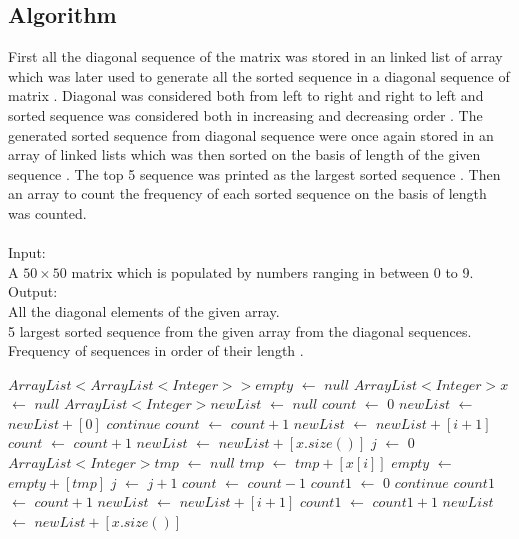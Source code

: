 \documentclass[twocolumn]{article}      %
\begin{document}
\subsection{Algorithm}
First all the diagonal sequence of the matrix was stored in an linked list of array which was later used to generate all the sorted sequence in a diagonal sequence of matrix . Diagonal was considered both from left to right and right to left and sorted sequence was considered both in increasing and decreasing order . The generated sorted sequence from diagonal sequence were once again stored in an array of linked lists which was then sorted on the basis of length of the given sequence . The top 5 sequence was printed as the largest sorted sequence . Then an array to count the frequency of each sorted sequence on the basis of length was counted.\\\\
Input:\\
A $50\times50$ matrix which is populated by numbers ranging in between 0 to 9.
Output:\\
All the diagonal elements of the given array.\\
5 largest sorted sequence from the given array from the diagonal sequences.\\
Frequency of sequences in order of their length .
\begin{algorithm}
\begin{algorithmic}[1]
\State $ArrayList<ArrayList<Integer>>empty$ $\gets$ $null$
\State $ArrayList<Integer>x$ $\gets$ $null$
\State $ArrayList<Integer>newList$ $\gets$ $null$
\State $count$ $\gets$ $0$
\State $newList$ $\gets$ $newList+[0]$ 
\State $continue$
\EndIf
{}
\State $count$ $\gets$ $count+1$
\State $newList$ $\gets$ $newList + [i+1]$
\EndIf
\EndFor
\State $count$ $\gets$ $count+1$
\State $newList$ $\gets$ $newList+[x.size()]$
\State $j$ $\gets$ $0$
\State $ArrayList<Integer>tmp$ $\gets$ $null$
\State $tmp$ $\gets$ $tmp+[x[i]] $
\EndFor
\State $empty$ $\gets$ $empty+[tmp]$
\State $j$ $\gets$ $j+1$
\State $count$ $\gets$ $count-1$
\EndWhile
\State $count1$ $\gets$ $0$
\State $continue$
\EndIf
{}
\State $count1$ $\gets$ $count+1$
\State $newList$ $\gets$ $newList + [i+1]$
\EndIf
\EndFor
\State $count1$ $\gets$ $count1+1$
\State $newList$ $\gets$ $newList+[x.size()]$
  \end{algorithmic}
\end{algorithm}
\end{document}
